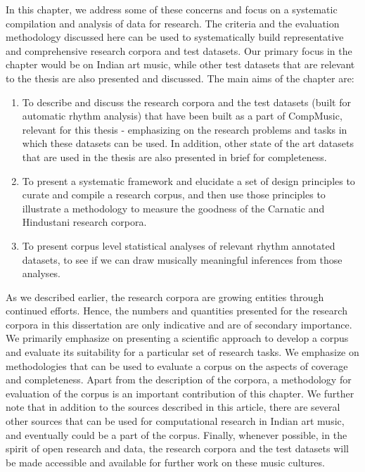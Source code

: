 In this chapter, we address some of these concerns and focus on a systematic compilation and analysis of data for research. The criteria and the evaluation methodology discussed here can be used to systematically build representative and comprehensive research corpora and test datasets. Our primary focus in the chapter would be on Indian art music, while other test datasets that are relevant to the thesis are also presented and discussed. The main aims of the chapter are: 
\begin{enumerate}[leftmargin=*]
 \item To describe and discuss the research corpora and the test datasets (built for automatic rhythm analysis) that have been built as a part of CompMusic, relevant for this thesis - emphasizing on the research problems and tasks in which these datasets can be used. In addition, other state of the art datasets that are used in the thesis are also presented in brief for completeness. 
 \item To present a systematic framework and elucidate a set of design principles to curate and compile a research corpus, and then use those principles to illustrate a methodology to measure the goodness of the Carnatic and Hindustani research corpora. 
 \item To present corpus level statistical analyses of relevant rhythm annotated datasets, to see if we can draw musically meaningful inferences from those analyses. 
\end{enumerate}

As we described earlier, the research corpora are growing entities through continued efforts. Hence, the numbers and quantities presented for the research corpora in this dissertation are only indicative and are of secondary importance. We primarily emphasize on presenting a scientific approach to develop a corpus and evaluate its suitability for a particular set of research tasks. We emphasize on methodologies that can be used to evaluate a corpus on the aspects of coverage and completeness. Apart from the description of the corpora, a methodology for evaluation of the corpus is an important contribution of this chapter. We further note that in addition to the sources described in this article, there are several other sources that can be used for computational research in Indian art music, and eventually could be a part of the corpus. Finally, whenever possible, in the spirit of open research and data, the research corpora and the test datasets will be made accessible and available for further work on these music cultures. 
